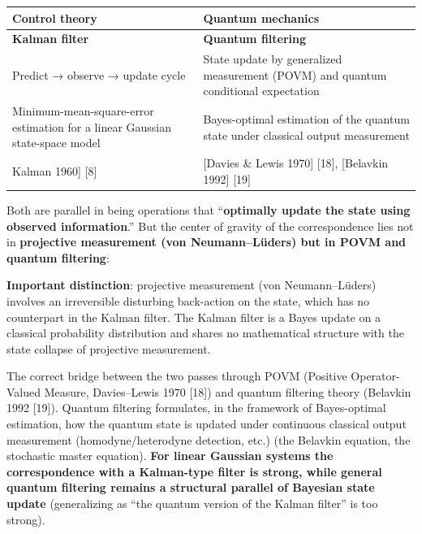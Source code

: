 \documentclass[
]{article}
\newcounter{none} %
\begin{document}
{\def\LTcaptype{none} %
\begin{longtable}[]{@{}
  >{\raggedright\arraybackslash}p{}
  >{\raggedright\arraybackslash}p{}@{}}
\toprule\noalign{}
\begin{minipage}[b]{\linewidth}\raggedright
Control theory
\end{minipage} & \begin{minipage}[b]{\linewidth}\raggedright
Quantum mechanics
\end{minipage} \\
\midrule\noalign{}
\endhead
\bottomrule\noalign{}
\endlastfoot
\textbf{Kalman filter} & \textbf{Quantum filtering} \\
Predict → observe → update cycle & State update by generalized
measurement (POVM) and quantum conditional expectation \\
Minimum-mean-square-error estimation for a linear Gaussian state-space
model & Bayes-optimal estimation of the quantum state under classical
output measurement \\
{[}Kalman 1960{]} {[}8{]} & {[}Davies \& Lewis 1970{]} {[}18{]},
{[}Belavkin 1992{]} {[}19{]} \\
\end{longtable}
}

Both are parallel in being operations that ``\textbf{optimally update
the state using observed information}.'' But the center of gravity of
the correspondence lies not in \textbf{projective measurement (von
Neumann--Lüders) but in POVM and quantum filtering}:

\textbf{Important distinction}: projective measurement (von
Neumann--Lüders) involves an irreversible disturbing back-action on the
state, which has no counterpart in the Kalman filter. The Kalman filter
is a Bayes update on a classical probability distribution and shares no
mathematical structure with the state collapse of projective
measurement.

The correct bridge between the two passes through POVM (Positive
Operator-Valued Measure, Davies--Lewis 1970 {[}18{]}) and quantum
filtering theory (Belavkin 1992 {[}19{]}). Quantum filtering formulates,
in the framework of Bayes-optimal estimation, how the quantum state is
updated under continuous classical output measurement
(homodyne/heterodyne detection, etc.) (the Belavkin equation, the
stochastic master equation). \textbf{For linear Gaussian systems the
correspondence with a Kalman-type filter is strong, while general
quantum filtering remains a structural parallel of Bayesian state
update} (generalizing as ``the quantum version of the Kalman filter'' is
too strong).
\end{document}
